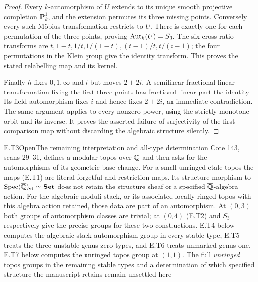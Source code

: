\begin{proof}
Every $k$-automorphism of $U$ extends to its unique smooth
projective completion $\mathbf P^1_k$, and the extension
permutes its three missing points.  Conversely every such
M\"obius transformation restricts to $U$.  There is exactly one
for each permutation of the three points, proving $\operatorname{Aut}_k(U)=S_3$.
The six cross-ratio transforms are
$t,1-t,1/t,1/(1-t),(t-1)/t,t/(t-1)$; the four permutations in
the Klein group give the identity transform.  This proves the
stated relabelling map and its kernel.

Finally $h$ fixes $0,1,\infty$ and $i$ but moves $2+2i$.
A semilinear fractional-linear transformation fixing the first
three points has fractional-linear part the identity.  Its
field automorphism fixes $i$ and hence fixes $2+2i$, an immediate
contradiction.  The same argument applies to every nonzero power,
using the strictly monotone orbit and its inverse.  It proves
the asserted failure of surjectivity of the first comparison
map without discarding the algebraic structure silently.
\end{proof}

\begin{result}{E.T3}{Open}{The remaining interpretation and all-type determination}
Cote 143, scans 29--31, defines a modular topos over $\mathbb Q$ and
then asks for the automorphisms of its geometric base change.
For a small unringed etale topos the maps (E.T1) are literal
forgetful and restriction maps.  Its structure morphism to
$\operatorname{Spec}(\overline{\mathbb Q})_{\mathrm{et}}\simeq\mathbf{Set}$
does not retain the structure sheaf or a specified
$\overline{\mathbb Q}$-algebra action.  For the algebraic moduli stack,
or its associated locally ringed topos with this algebra
action retained, those data are part of an automorphism.
At $(0,3)$ both groups of automorphism classes are trivial;
at $(0,4)$ (E.T2) and $S_3$ respectively give the precise groups
for these two constructions.  E.T4 below computes the algebraic
stack automorphism group in every stable type, E.T5 treats
the three unstable genus-zero types, and E.T6 treats unmarked
genus one.  E.T7 below computes the unringed topos group
at $(1,1)$.  The full \emph{unringed} topos groups in the
remaining stable types and a determination of which specified
structure the manuscript retains remain unsettled here.
\end{result}

